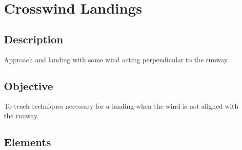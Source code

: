 \section{Crosswind Landings}

\subsection{Description}

Approach and landing with some wind acting perpendicular to the runway.

\subsection{Objective}

To teach techniques necessary for a landing when the wind is not aligned with
the runway.

\subsection{Elements}

